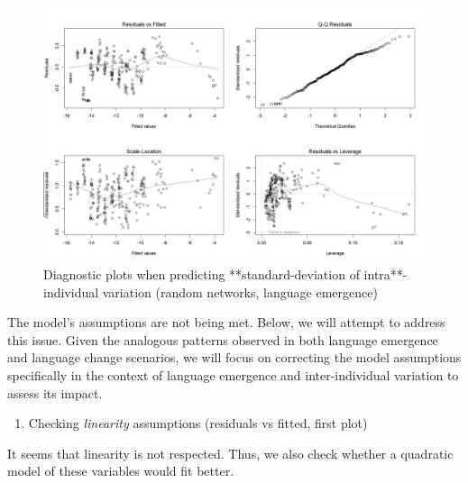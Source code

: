 \documentclass[
]{article}
\providecommand{\tightlist}{%
  \setlength{\itemsep}{0pt}\setlength{\parskip}{0pt}}
\begin{document}
\begin{figure}[!H]

{\centering \includegraphics{./Figures/unnamed-chunk-126-1} 

}

\caption{Diagnostic plots when predicting **standard-deviation of intra**-individual variation (random networks, language emergence)}\label{fig:unnamed-chunk-126}
\end{figure}

The model's assumptions are not being met. Below, we will attempt to
address this issue. Given the analogous patterns observed in both
language emergence and language change scenarios, we will focus on
correcting the model assumptions specifically in the context of language
emergence and inter-individual variation to assess its impact.

\begin{enumerate}
\def\labelenumi{\arabic{enumi}.}
\tightlist
\item
  Checking \emph{linearity} assumptions (residuals vs fitted, first
  plot)
\end{enumerate}

It seems that linearity is not respected. Thus, we also check whether a
quadratic model of these variables would fit better.
\end{document}
